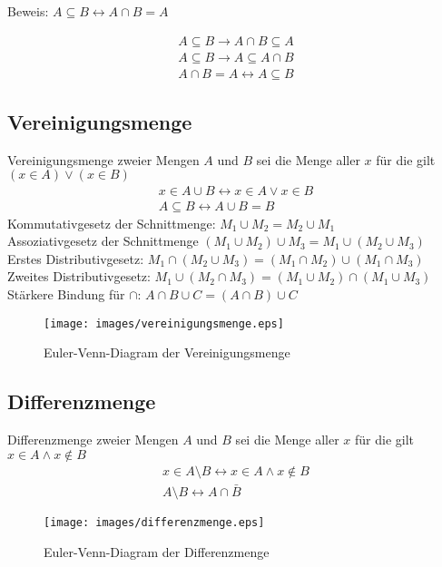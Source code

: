 \documentclass[a4paper]{scrartcl}
\begin{document}
Beweis: $A \subseteq B \leftrightarrow A \cap B = A$

\begin{align}
A \subseteq B \rightarrow A \cap B \subseteq A \\
A \subseteq B \rightarrow A \subseteq A \cap B \\
A \cap B = A \leftrightarrow A \subseteq B
\end{align}

\newpage

\subsection{Vereinigungsmenge}
Vereinigungsmenge zweier Mengen $A$ und $B$ sei die Menge aller $x$ für die gilt $(x \in A) \vee (x \in B)$ \\
\begin{align}
x \in A \cup B \leftrightarrow x \in A \vee x \in B \\
A \subseteq B \leftrightarrow A \cup B = B
\end{align}
Kommutativgesetz der Schnittmenge: $ M_1 \cup M_2 = M_2 \cup M_1$ \\
Assoziativgesetz der Schnittmenge $ (M_1 \cup M_2) \cup M_3 = M_1 \cup (M_2 \cup M_3) $ \\
Erstes Distributivgesetz: $M_1 \cap (M_2 \cup M_3) = (M_1 \cap M_2) \cup (M_1 \cap M_3) $ \\
Zweites Distributivgesetz: $M_1 \cup (M_2 \cap M_3) = (M_1 \cup M_2) \cap (M_1 \cup M_3) $ \\
Stärkere Bindung für $\cap$: $A \cap B \cup C = (A \cap B) \cup C$
\begin{figure}[h]
\begin{center}
\texttt{[image: images/vereinigungsmenge.eps]}
\caption{Euler-Venn-Diagram der Vereinigungsmenge}
\label{labelname}
\end{center}
\end{figure}

\subsection{Differenzmenge}
Differenzmenge zweier Mengen $A$ und $B$ sei die Menge aller $x$ für die gilt $x \in A \wedge x \not\in B$
\begin{align}
x \in A \setminus B \leftrightarrow x \in A \wedge x \not\in B \\
A \setminus B \leftrightarrow A \cap \bar B
\end{align}
\begin{figure}[h!]
\begin{center}
\texttt{[image: images/differenzmenge.eps]}
\caption{Euler-Venn-Diagram der Differenzmenge}
\label{labelname}
\end{center}
\end{figure}
\end{document}
